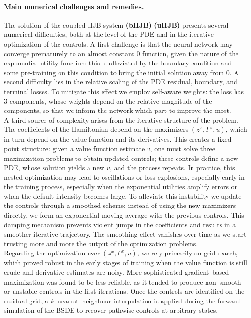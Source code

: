 \documentclass[11pt,a4paper]{article}
\theoremstyle{thmstyleone}%
\theoremstyle{thmstyletwo}%
\theoremstyle{thmstylethree}%
\begin{document}
\paragraph{Main numerical challenges and remedies.}
The solution of the coupled HJB system \textbf{(bHJB)}-\textbf{(uHJB)} presents several numerical difficulties, both at the level of the PDE and in the iterative optimization of the controls. A first challenge is that the neural network may converge prematurely to an almost constant $0$ function, given the nature of the exponential utility function: this is alleviated by the boundary condition and some pre-training on this condition to bring the initial solution away from $0$.
A second difficulty lies in the relative scaling of the PDE residual, boundary, and terminal losses. To mitigate this effect we employ self-aware weights: the loss has $3$ components, whose weights depend on the relative magnitude of the components, so that we inform the network which part to improve the most. \\
A third source of complexity arises from the iterative structure of the
problem. The coefficients of the Hamiltonian depend on the maximizers
$(z^{x},\Gamma^{x},u)$, which in turn depend on the value function and its derivatives. This creates a fixed-point structure: given a value function estimate $v$, one must solve three maximization problems to obtain updated controls; these controls define a new PDE, whose solution yields a new $v$, and the process repeats. In practice, this nested optimization may lead to
oscillations or loss explosions, especially early in the training process, especially when the exponential utilities amplify
errors or when the default intensity becomes large. To alleviate this
instability we update the controls through a smoothed scheme: instead of
using the new maximizers directly, we form an exponential moving average with
the previous controls. This damping mechanism prevents violent jumps in the
coefficients and results in a smoother iterative trajectory. The smoothing effect vanishes over time as we start trusting more and more the output of the optimization problems.\\
Regarding the optimization over $(z^{x},\Gamma^{x},u)$, we rely primarily on
grid search, which proved robust in the early stages of training when the value function is still crude and derivative estimates are noisy. More sophisticated gradient--based maximization was found to be less reliable, as it tended to produce non--smooth or unstable controls in the first iterations. Once the
controls are identified on the residual grid, a $k$--nearest--neighbour interpolation is applied during the forward simulation of the BSDE to recover pathwise controls at arbitrary states.
\end{document}
